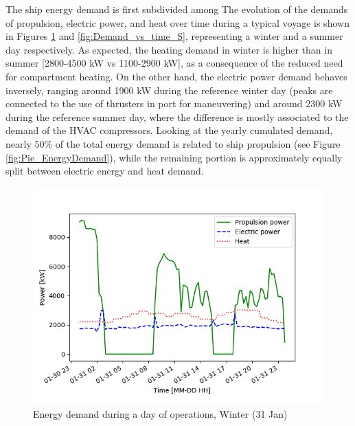 \documentclass[preprint,12pt]{elsarticle}
\begin{document}
The ship energy demand is first subdivided among  The evolution of the demands of propulsion, electric power, and heat over time during a typical voyage is shown in Figures \ref{fig:Demand_vs_time_W} and \ref{fig:Demand_vs_time_S}, representing a winter and a summer day respectively. As expected, the heating demand in winter is higher than in summer [2800-4500 kW vs 1100-2900 kW], as a consequence of the reduced need for compartment heating. On the other hand, the electric power demand behaves inversely, ranging around 1900 kW during the reference winter day (peaks are connected to the use of thrusters in port for maneuvering) and around 2300 kW during the reference summer day, where the difference is mostly associated to the demand of the HVAC compressors. Looking at the yearly cumulated demand, nearly 50\% of the total energy demand is related to ship propulsion (see Figure \ref{fig:Pie_EnergyDemand}), while the remaining portion is approximately equally split between electric energy and heat demand.



\begin{figure}[htbp]
	\centering
	\includegraphics[width=0.9\linewidth]{Figures/Demand_vs_time_W}
	\caption{Energy demand during a day of operations, Winter (31 Jan)}
	\label{fig:Demand_vs_time_W}
\end{figure}
\end{document}
